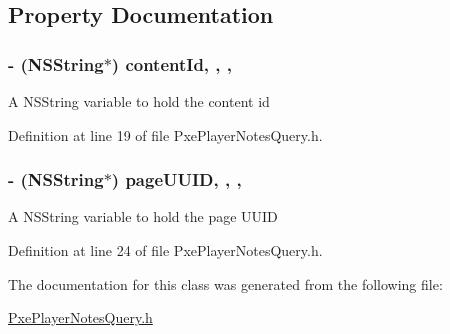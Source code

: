 \subsection{Property Documentation}
\hypertarget{interface_pxe_player_notes_query_a66597b0335428b0dc9c3c1fef4ad3fee}{
\subsubsection[{content\-Id}]{\setlength{\rightskip}{0pt plus 5cm}-\/ (N\-S\-String$\ast$) content\-Id\hspace{0.3cm}{\ttfamily [read]}, {\ttfamily [write]}, {\ttfamily [nonatomic]}, {\ttfamily [strong]}}}\label{interface_pxe_player_notes_query_a66597b0335428b0dc9c3c1fef4ad3fee}
A N\-S\-String variable to hold the content id 

Definition at line 19 of file Pxe\-Player\-Notes\-Query.\-h.

\hypertarget{interface_pxe_player_notes_query_a4e8cb70602c3cf22f44a258f925763f0}{
\subsubsection[{page\-U\-U\-I\-D}]{\setlength{\rightskip}{0pt plus 5cm}-\/ (N\-S\-String$\ast$) page\-U\-U\-I\-D\hspace{0.3cm}{\ttfamily [read]}, {\ttfamily [write]}, {\ttfamily [nonatomic]}, {\ttfamily [strong]}}}\label{interface_pxe_player_notes_query_a4e8cb70602c3cf22f44a258f925763f0}
A N\-S\-String variable to hold the page U\-U\-I\-D 

Definition at line 24 of file Pxe\-Player\-Notes\-Query.\-h.



The documentation for this class was generated from the following file\-:\begin{DoxyCompactItemize}
\item 
\hyperlink{_pxe_player_notes_query_8h}{Pxe\-Player\-Notes\-Query.\-h}\end{DoxyCompactItemize}
